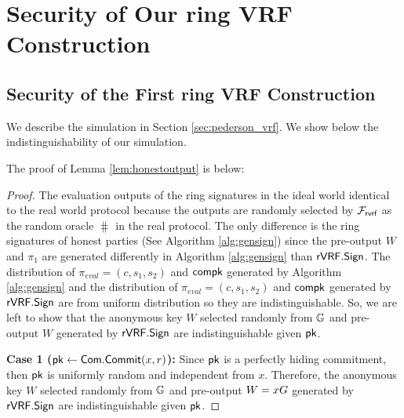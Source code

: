 %
\section{Security of Our ring VRF Construction}

\subsection{Security of the First ring VRF Construction}
\label{ap:firstprotocolproof}
We describe the simulation in Section \ref{sec:pederson_vrf}. We show below the indistinguishability of our simulation.

The  proof of Lemma \ref{lem:honestoutput} is below:

\begin{proof}
	The evaluation outputs of the ring signatures in the ideal world identical to the real world protocol because  the outputs are randomly selected by $ \mathcal{F}_{\textsf{rvrf}} $ as the random oracle $ \hash $ in the real protocol. The only difference is the ring signatures of honest parties (See Algorithm \ref{alg:gensign}) since the pre-output $ W $ and $ \pi_1 $ are generated differently in Algorithm \ref{alg:gensign} than $ {\mathsf{rVRF}}.{\mathsf{Sign}} $. The distribution of $ \pi_{eval} = (c,s_1, s_2) $ and $ \mathsf{compk} $ generated by Algorithm \ref{alg:gensign} and the distribution of $ \pi_{eval} = (c,s_1, s_2) $ and $ \mathsf{compk} $ generated by $ {\mathsf{rVRF}}.{\mathsf{Sign}} $ are from uniform distribution so they are indistinguishable. So, we are left to show that the anonymous key $ W $ selected randomly from $ {\mathbb{G}} $ and pre-output $	 W $ generated by $ {\mathsf{rVRF}}.{\mathsf{Sign}} $ are indistinguishable given $ \mathsf{pk}  $. 
	
	\textbf{Case 1 ($ \mathsf{pk} \leftarrow \mathsf{Com}.\mathsf{Commit}(x,r)$):} Since $ \mathsf{pk}$ is a perfectly hiding commitment, then  $ \mathsf{pk} $ is uniformly random and independent from $ x $. Therefore,  the anonymous key $ W $ selected randomly from $ {\mathbb{G}} $ and pre-output $ W = x G $ generated by $ {\mathsf{rVRF}}.{\mathsf{Sign}} $ are indistinguishable given $ \mathsf{pk}  $.
	

\end{proof}
